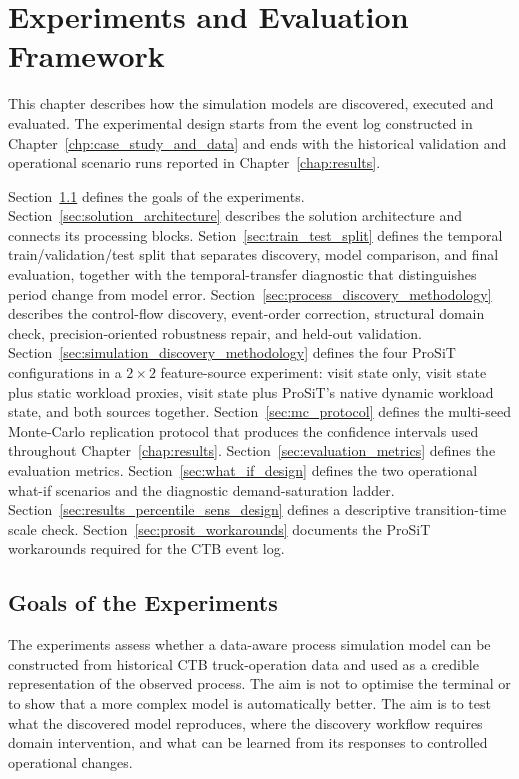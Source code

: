 \chapter{Experiments and Evaluation Framework}
\label{chp:experiments_and_framework}

This chapter describes how the simulation models are discovered, executed and
evaluated. The experimental design starts from the event log constructed in
Chapter~\ref{chp:case_study_and_data} and ends with the historical validation
and operational scenario runs reported in Chapter~\ref{chap:results}.

Section~\ref{sec:experiment_goals} defines the goals of the experiments.
Section~\ref{sec:solution_architecture} describes the solution architecture
and connects its processing blocks. Setion~\ref{sec:train_test_split} defines
the temporal train/validation/test split that separates discovery, model
comparison, and final evaluation, together with the
temporal-transfer diagnostic that distinguishes period change from model error.
Section~\ref{sec:process_discovery_methodology} describes the
control-flow discovery, event-order correction, structural domain check,
precision-oriented robustness repair, and held-out validation.
Section~\ref{sec:simulation_discovery_methodology} defines the four ProSiT
configurations in a $2\times2$ feature-source experiment: visit state only,
visit state plus static workload proxies, visit state plus ProSiT's native
dynamic workload state, and both sources together.
Section~\ref{sec:mc_protocol} defines the
multi-seed Monte-Carlo replication protocol that produces the
confidence intervals used throughout Chapter~\ref{chap:results}.
Section~\ref{sec:evaluation_metrics} defines the evaluation metrics.
Section~\ref{sec:what_if_design} defines the two operational what-if scenarios
and the diagnostic demand-saturation ladder.
Section~\ref{sec:results_percentile_sens_design} defines a descriptive
transition-time scale check.
Section~\ref{sec:prosit_workarounds} documents the ProSiT workarounds required
for the CTB event log.

\section{Goals of the Experiments}
\label{sec:experiment_goals}

The experiments assess whether a data-aware process simulation model can be
constructed from historical CTB truck-operation data and used as a credible
representation of the observed process. The aim is not to optimise the
terminal or to show that a more complex model is automatically better. The
aim is to test what the discovered model reproduces, where the discovery
workflow requires domain intervention, and what can be learned from its
responses to controlled operational changes.

